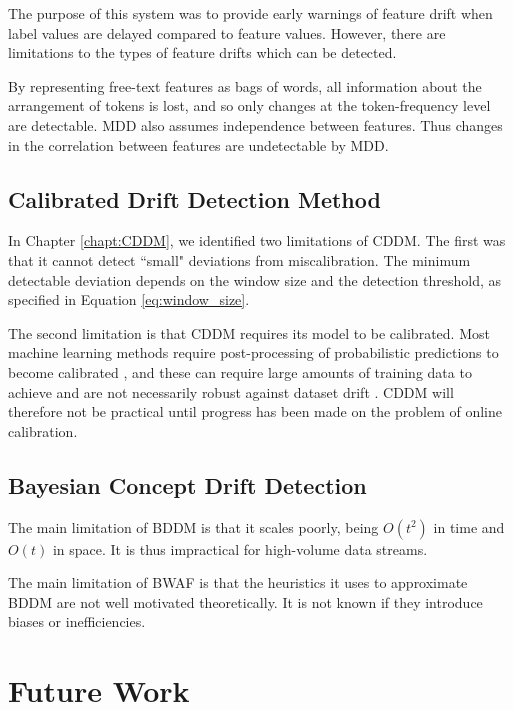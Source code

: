 The purpose of this system was to provide early warnings of feature drift when label values are delayed compared to feature values. However, there are limitations to the types of feature drifts which can be detected. 

By representing free-text features as bags of words, all information about the arrangement of tokens is lost, and so only changes at the token-frequency level are detectable. MDD also assumes independence between features. Thus changes in the correlation between features are undetectable by MDD.

\subsection{Calibrated Drift Detection Method}

In Chapter \ref{chapt:CDDM}, we identified two limitations of CDDM. The first was that it cannot detect ``small" deviations from miscalibration. The minimum detectable deviation depends on the window size and the detection threshold, as specified in Equation \ref{eq:window_size}. 

The second limitation is that CDDM requires its model to be calibrated. Most machine learning methods require post-processing of probabilistic predictions to become calibrated \cite{calibrating}, and these can require large amounts of training data to achieve \cite{beyond_sigmoids} and are not necessarily robust against dataset drift \cite{dataset_drift}. CDDM will therefore not be practical until progress has been made on the problem of online calibration. 

\subsection{Bayesian Concept Drift Detection}

The main limitation of BDDM is that it scales poorly, being $O(t^2)$ in time and $O(t)$ in space. It is thus impractical for high-volume data streams. 

The main limitation of BWAF is that the heuristics it uses to approximate BDDM are not well motivated theoretically. It is not known if they introduce biases or inefficiencies.  


\section{Future Work} \label{conclusions:future_word}

